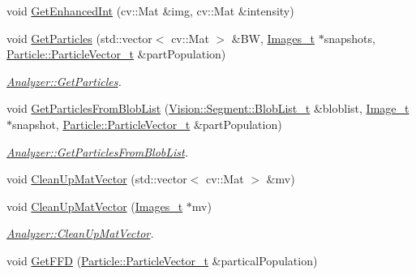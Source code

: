 \begin{DoxyCompactItemize}
\item 
void \hyperlink{class_soil_analyzer_1_1_analyzer_a9c018641de5278b9db39ce668ebc0920}{Get\+Enhanced\+Int} (cv\+::\+Mat \&img, cv\+::\+Mat \&intensity)
\item 
void \hyperlink{class_soil_analyzer_1_1_analyzer_af014193f37cc1cac631491687c292060}{Get\+Particles} (std\+::vector$<$ cv\+::\+Mat $>$ \&B\+W, \hyperlink{class_soil_analyzer_1_1_analyzer_a55e2c84ab42cb967d718dd18295c1f91}{Images\+\_\+t} $\ast$snapshots, \hyperlink{class_soil_analyzer_1_1_particle_a4e43dab999d36d5a5f809bb4be5ff3a7}{Particle\+::\+Particle\+Vector\+\_\+t} \&part\+Population)
\begin{DoxyCompactList}\small\item\em \hyperlink{class_soil_analyzer_1_1_analyzer_af014193f37cc1cac631491687c292060}{Analyzer\+::\+Get\+Particles}. \end{DoxyCompactList}\item 
void \hyperlink{class_soil_analyzer_1_1_analyzer_acfe01406c180dd154fefbe13e7f18a4d}{Get\+Particles\+From\+Blob\+List} (\hyperlink{class_vision_1_1_segment_a60e08251e2ab94239e245044c31cde51}{Vision\+::\+Segment\+::\+Blob\+List\+\_\+t} \&bloblist, \hyperlink{struct_soil_analyzer_1_1_analyzer_1_1_image__t}{Image\+\_\+t} $\ast$snapshot, \hyperlink{class_soil_analyzer_1_1_particle_a4e43dab999d36d5a5f809bb4be5ff3a7}{Particle\+::\+Particle\+Vector\+\_\+t} \&part\+Population)
\begin{DoxyCompactList}\small\item\em \hyperlink{class_soil_analyzer_1_1_analyzer_acfe01406c180dd154fefbe13e7f18a4d}{Analyzer\+::\+Get\+Particles\+From\+Blob\+List}. \end{DoxyCompactList}\item 
void \hyperlink{class_soil_analyzer_1_1_analyzer_a9b143f9920d90ecd54a3b0bb3b0e28fc}{Clean\+Up\+Mat\+Vector} (std\+::vector$<$ cv\+::\+Mat $>$ \&mv)
\item 
void \hyperlink{class_soil_analyzer_1_1_analyzer_ae984518e891a93fd885d2d9bd345b934}{Clean\+Up\+Mat\+Vector} (\hyperlink{class_soil_analyzer_1_1_analyzer_a55e2c84ab42cb967d718dd18295c1f91}{Images\+\_\+t} $\ast$mv)
\begin{DoxyCompactList}\small\item\em \hyperlink{class_soil_analyzer_1_1_analyzer_a9b143f9920d90ecd54a3b0bb3b0e28fc}{Analyzer\+::\+Clean\+Up\+Mat\+Vector}. \end{DoxyCompactList}\item 
void \hyperlink{class_soil_analyzer_1_1_analyzer_aeed5e3b158ff37d5fecb2816e12c3c31}{Get\+F\+F\+D} (\hyperlink{class_soil_analyzer_1_1_particle_a4e43dab999d36d5a5f809bb4be5ff3a7}{Particle\+::\+Particle\+Vector\+\_\+t} \&partical\+Population)

\end{DoxyCompactItemize}
